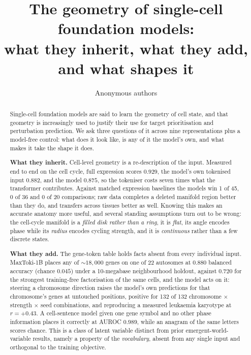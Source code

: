 \documentclass[11pt]{article}
\title{\bfseries The geometry of single-cell foundation models:\\
what they inherit, what they add, and what shapes it}
\author{Anonymous authors}
\date{}
\begin{document}
\maketitle

\begin{abstract}
\noindent
Single-cell foundation models are said to learn the geometry of cell state, and that geometry is
increasingly used to justify their use for target prioritisation and perturbation prediction. We ask
three questions of it across nine representations plus a model-free control: what does it look like,
is any of it the model's own, and what makes it take the shape it does.

\textbf{What they inherit.} Cell-level geometry is a re-description of the input. Measured end to end
on the cell cycle, full expression scores $0.929$, the model's own tokenised input $0.882$, and the
model $0.875$, so the tokeniser costs seven times what the transformer contributes. Against matched
expression baselines the models win 1 of 45, 0 of 36 and 0 of 20 comparisons; raw data completes a
deleted manifold region better than they do, and transfers across tissues better as well. Knowing this
makes an accurate anatomy more useful, and several standing assumptions turn out to be wrong: the cell-cycle manifold is a \emph{filled disk rather than a
ring}, it is \emph{flat}, its angle encodes phase while its \emph{radius} encodes cycling strength, and
it is \emph{continuous} rather than a few discrete states.

\textbf{What they add.} The gene-token table holds facts absent from every individual input.
MaxToki-1B places any of ${\sim}18{,}000$ genes on one of 22 autosomes at $0.880$ balanced accuracy
(chance $0.045$) under a 10-megabase neighbourhood holdout, against $0.720$ for the strongest
training-free factorisation of the same cells, and the model acts on it: steering a chromosome
direction raises the model's own predictions for that chromosome's genes at untouched positions,
positive for 132 of 132 chromosome $\times$ strength $\times$ seed combinations, and reproducing a
measured leukaemia karyotype at $r=+0.43$. A cell-sentence model given one gene symbol and no other
phase information places it correctly at AUROC $0.989$, while an anagram of the same letters scores
chance. This is a class of latent variable distinct from prior emergent-world-variable results, namely
a property of the \emph{vocabulary}, absent from any single input and orthogonal to the training
objective.


\end{abstract}
\end{document}
